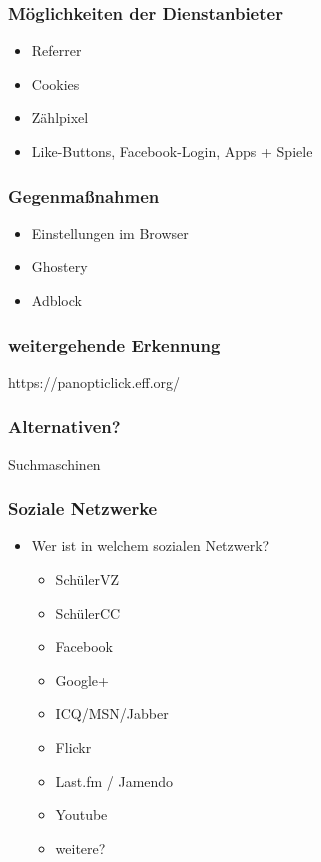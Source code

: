 \documentclass[12pt]{beamer}
\begin{document}
\begin{frame}
\begin{frame}
  \frametitle{Möglichkeiten der Dienstanbieter}
      \begin{itemize}
        \item<1-> Referrer
        \item<2-> Cookies
        \item<3-> Zählpixel
        \item<4-> Like-Buttons, Facebook-Login, Apps + Spiele
      \end{itemize}
\end{frame}

\begin{frame}
  \frametitle{Gegenmaßnahmen}
      \begin{itemize}
        \item<2-> Einstellungen im Browser
        \item<3-> Ghostery
        \item<4-> Adblock
      \end{itemize}
\end{frame}

\begin{frame}
  \frametitle{weitergehende Erkennung}
  \begin{center} \Large
    https://panopticlick.eff.org/
  \end{center}
\end{frame}


\begin{frame}
  \frametitle{Alternativen?}
  \begin{center} \Large
    Suchmaschinen
  \end{center}
\end{frame}

\begin{frame}
  \frametitle{Soziale Netzwerke}

  \begin{itemize}
    \item Wer ist in welchem sozialen Netzwerk?
      \begin{itemize}
        \item SchülerVZ
        \item SchülerCC
        \item Facebook
        \item Google+
        \item ICQ/MSN/Jabber
        \item Flickr
        \item Last.fm / Jamendo
        \item Youtube
        \item weitere?
      \end{itemize}
  \end{itemize}
\end{frame}


\end{frame}
\end{document}
